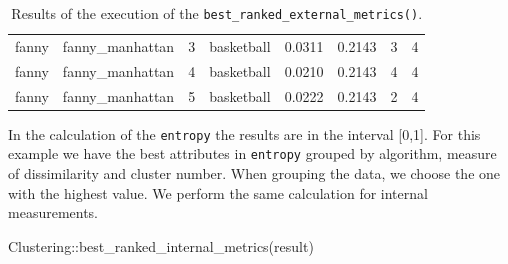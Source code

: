 \documentclass[
]{article}
\newenvironment{Shaded}{\begin{snugshade}}{\end{snugshade}}
\newcommand{\FunctionTok}[1]{\textcolor[rgb]{0.00,0.00,0.00}{#1}}
\newcommand{\NormalTok}[1]{#1}
\newcommand{\SpecialCharTok}[1]{\textcolor[rgb]{0.00,0.00,0.00}{#1}}
\begin{document}
\begin{table}[h!]
\begin{tabular}{| p{1.3cm} | p{2.1cm} | p{0.9cm} | p{1.1cm} | p{1.6cm} | p{0.8cm} | p{2.1cm} | p{1.5cm} |}
\cline{2-8}
\scriptsize fanny      & \scriptsize fanny\_manhattan & \scriptsize     3     & \scriptsize basketball  & \scriptsize     0.0311    & \scriptsize 0.2143 &  \scriptsize        3        & \scriptsize      4 \\
\scriptsize fanny      & \scriptsize fanny\_manhattan & \scriptsize     4     & \scriptsize basketball  & \scriptsize     0.0210    & \scriptsize 0.2143 &  \scriptsize        4        & \scriptsize      4 \\
\scriptsize fanny      & \scriptsize fanny\_manhattan & \scriptsize     5     & \scriptsize basketball  & \scriptsize     0.0222    & \scriptsize 0.2143 &  \scriptsize        2        & \scriptsize      4 \\
\hline
\end{tabular}
\caption{Results of the execution of the \texttt{best\_ranked\_external\_metrics()}.}
\label{tab:clusteringbestrankedexternalmetrics}
\end{table}

In the calculation of the \texttt{entropy} the results are in the
interval {[}0,1{]}. For this example we have the best attributes in
\texttt{entropy} grouped by algorithm, measure of dissimilarity and
cluster number. When grouping the data, we choose the one with the
highest value. We perform the same calculation for internal
measurements.

\begin{Shaded}
\begin{Highlighting}[]
\NormalTok{Clustering}\SpecialCharTok{::}\FunctionTok{best\_ranked\_internal\_metrics}\NormalTok{(result)}
\end{Highlighting}
\end{Shaded}
\end{document}
